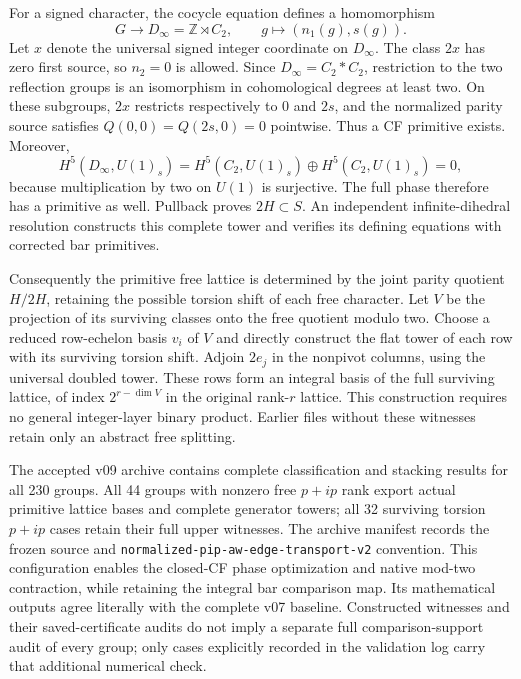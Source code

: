 \documentclass[11pt]{article}
\begin{document}
For a signed character, the cocycle equation defines a homomorphism
\begin{equation}
 G\longrightarrow D_\infty=\mathbb Z\rtimes C_2,
 \qquad g\longmapsto(n_1(g),s(g)).
\end{equation}
Let $x$ denote the universal signed integer coordinate on $D_\infty$.
The class $2x$ has zero first source, so $n_2=0$ is allowed. Since
$D_\infty=C_2*C_2$, restriction to the two reflection groups is an
isomorphism in cohomological degrees at least two. On these subgroups,
$2x$ restricts respectively to $0$ and $2s$, and the normalized parity
source satisfies $Q(0,0)=Q(2s,0)=0$ pointwise. Thus a CF primitive exists.
Moreover,
\begin{equation}
 H^5(D_\infty,U(1)_s)
 =H^5(C_2,U(1)_s)\oplus H^5(C_2,U(1)_s)=0,
\end{equation}
because multiplication by two on $U(1)$ is surjective. The full phase
therefore has a primitive as well. Pullback proves $2H\subset S$.
An independent infinite-dihedral resolution constructs this complete
tower and verifies its defining equations with corrected bar primitives.

Consequently the primitive free lattice is determined by the joint
parity quotient $H/2H$, retaining the possible torsion shift of each
free character. Let $V$ be the projection of its surviving classes onto
the free quotient modulo two. Choose a reduced row-echelon basis
$v_i$ of $V$ and directly construct the flat tower of each row with its
surviving torsion shift. Adjoin $2e_j$ in the nonpivot columns, using the
universal doubled tower. These rows form an integral basis of the full
surviving lattice, of index $2^{r-\dim V}$ in the original rank-$r$
lattice. This construction requires no general integer-layer binary
product. Earlier files without these witnesses retain only an abstract
free splitting.

The accepted v09 archive  contains complete
classification and stacking results for all 230 groups. All 44 groups with
nonzero free $p+ip$ rank export actual primitive lattice bases and complete
generator towers; all 32 surviving torsion $p+ip$ cases retain their full
upper witnesses. The archive manifest records the frozen source and
\texttt{normalized-pip-aw-edge-transport-v2} convention. This configuration
enables the closed-CF phase optimization and native mod-two contraction,
while retaining the integral bar comparison map. Its mathematical outputs
agree literally with the complete v07 baseline. Constructed witnesses and
their saved-certificate audits do not imply a separate full comparison-support
audit of every group; only cases explicitly recorded in the validation log
carry that additional numerical check.
\end{document}
